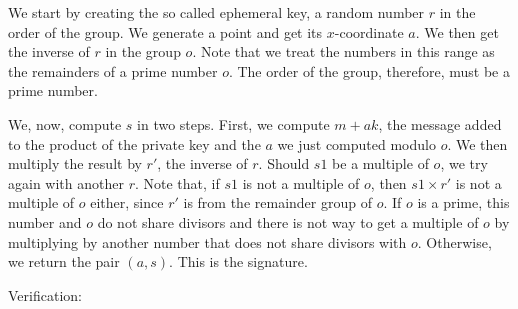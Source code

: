 \documentclass[tikz]{scrreprt}
\begin{document}
We start by creating the so called ephemeral key,
a random number $r$ in the order of the group.
We generate a point and get its $x$-coordinate $a$.
We then get the inverse of $r$ in the group $o$.
Note that we treat the numbers in this range
as the remainders of a prime number $o$.
The order of the group, therefore, must be a prime number.

We, now, compute $s$ in two steps.
First, we compute $m+ak$, the message added to the product
of the private key and the $a$ we just computed modulo $o$.
We then multiply the result by $r'$, the inverse of $r$.
Should $s1$ be a multiple of $o$, we try again with another $r$.
Note that, if $s1$ is not a multiple of $o$, then $s1 \times r'$
is not a multiple of $o$ either, since $r'$ is from the
remainder group of $o$. If $o$ is a prime, this number and $o$
do not share divisors and there is not way to get a multiple of $o$
by multiplying by another number that does not share divisors with $o$.
Otherwise, we return the pair $(a,s)$.
This is the signature.

Verification:
\end{document}
